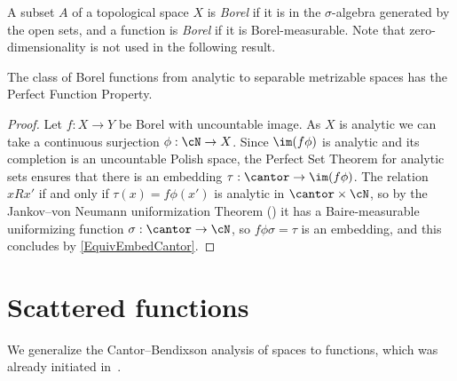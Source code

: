 A subset $A$ of a topological space $X$ is \emph{Borel} if it is in the $\sigma$-algebra generated by the open sets,
and a function is \emph{Borel} if it is Borel-measurable. Note that zero-dimensionality is not used in the following result.

\begin{proposition}\label{uncountablerange}
The class of Borel functions from analytic to separable metrizable spaces has the Perfect Function Property.
\end{proposition}

\begin{proof}
Let $f:X\to Y$ be Borel with uncountable image. As $X$ is analytic we can take a continuous surjection $\phi:\cN\to X$.
Since $\im(f\phi)$ is analytic and its completion is an uncountable Polish space, the Perfect Set Theorem for analytic sets \cite[(29.1)]{kechris} ensures that there is an embedding $\tau:\cantor\to\im(f\phi)$.
The relation $xRx'$ if and only if $\tau(x)=f\phi(x')$ is analytic in $\cantor\times\cN$, so by the Jankov--von Neumann uniformization Theorem (\cite[(29.9)]{kechris})
it has a Baire-measurable uniformizing function $\sigma:\cantor\to\cN$, so $f\phi\sigma=\tau$ is an embedding, and this concludes by \cref{EquivEmbedCantor}.
\end{proof}


\section{Scattered functions}\label{sectionCB}

We generalize the Cantor--Bendixson analysis of spaces to functions, which was already initiated in~\cite{carroy2013quasi}. %


